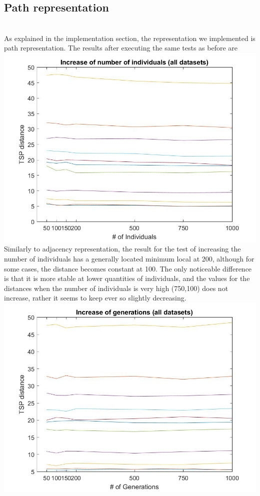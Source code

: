 \subsection{Path representation}\\
As explained in the implementation section, the representation we
implemented is path representation. The results after executing the same
tests as before are\\
\includegraphics[width=\textwidth]{img/order_crossover/numberIndiv.jpg}\\
Similarly to adjacency representation, the result for the test
of increasing the number of individuals has a generally located minimum local at
200, although for some cases, the distance becomes constant at 100. The only
noticeable difference is that it is more stable at lower quantities of
individuals, and the values for the distances when the number of
individuals is very high (750,100) does not increase, rather it seems to keep
ever so slightly decreasing. \\
\includegraphics[width=\textwidth]{img/order_crossover/numberGens.jpg}\\
